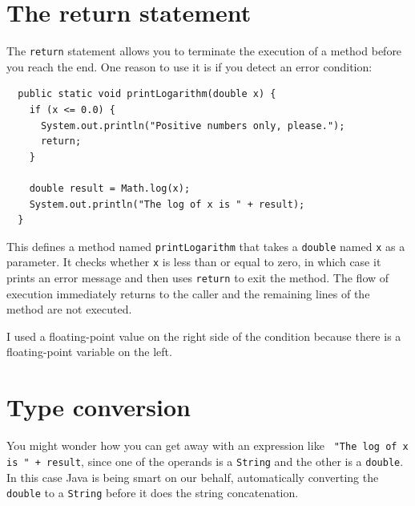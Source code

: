 \documentclass[12pt]{book}
\theoremstyle{exercise}
\begin{document}
\section{The return statement}

The {\tt return} statement allows you to terminate the execution
of a method before you reach the end.  One reason to use it
is if you detect an error condition:

\begin{lstlisting}
  public static void printLogarithm(double x) {
    if (x <= 0.0) {
      System.out.println("Positive numbers only, please.");
      return;
    }

    double result = Math.log(x);
    System.out.println("The log of x is " + result);
  }
\end{lstlisting}
%
This defines a method named {\tt printLogarithm} that takes a
{\tt  double} named {\tt x} as a parameter.  It checks whether
{\tt  x} is less than or equal to zero, in which case it prints an error
message and then uses {\tt return} to exit the method.  The flow of
execution immediately returns to the caller and the remaining lines of
the method are not executed.

I used a floating-point value on the right side of the condition
because there is a floating-point variable on the left.


\section {Type conversion}

You might wonder how you can get away with an expression like {\tt
"The log of x is " + result}, since one of the operands is a {\tt String}
and the other is a {\tt double}.  In this case Java is being
smart on our behalf, automatically converting the {\tt double} to a
{\tt String} before it does the string concatenation.


\end{document}
